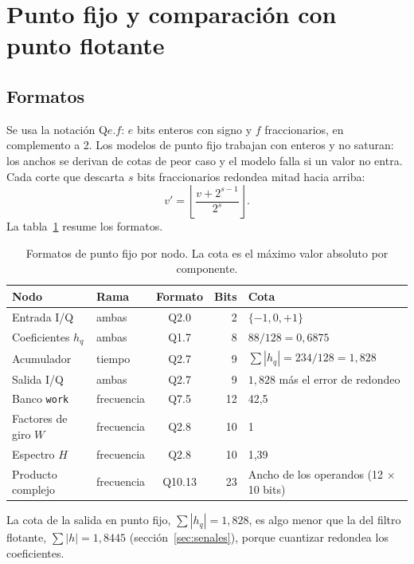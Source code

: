 \section{Punto fijo y comparación con punto flotante}\label{sec:punto-fijo}

\subsection{Formatos}

Se usa la notación Q$e.f$: $e$ bits enteros con signo y $f$ fraccionarios, en complemento a 2. Los modelos de punto fijo trabajan con enteros y no saturan: los anchos se derivan de cotas de peor caso y el modelo falla si un valor no entra. Cada corte que descarta $s$ bits fraccionarios redondea mitad hacia arriba:
\begin{equation}
  v' = \left\lfloor \frac{v + 2^{s-1}}{2^s} \right\rfloor .
\end{equation}
La tabla~\ref{tab:formatos} resume los formatos.

\begin{table}[h]
  \centering
  \caption{Formatos de punto fijo por nodo. La cota es el máximo valor absoluto por componente.}\label{tab:formatos}
  \begin{tabular}{llcrl}
    \toprule
    Nodo & Rama & Formato & Bits & Cota \\
    \midrule
    Entrada I/Q & ambas & Q2.0 & 2 & $\{-1, 0, +1\}$ \\
    Coeficientes $h_q$ & ambas & Q1.7 & 8 & $88/128 = 0{,}6875$ \\
    Acumulador & tiempo & Q2.7 & 9 & $\sum|h_q| = 234/128 = 1{,}828$ \\
    Salida I/Q & ambas & Q2.7 & 9 & $1{,}828$ más el error de redondeo \\
    Banco \texttt{work} & frecuencia & Q7.5 & 12 & 42,5 \\
    Factores de giro $W$ & frecuencia & Q2.8 & 10 & 1 \\
    Espectro $H$ & frecuencia & Q2.8 & 10 & 1,39 \\
    Producto complejo & frecuencia & Q10.13 & 23 & Ancho de los operandos (12 × 10 bits) \\
    \bottomrule
  \end{tabular}
\end{table}

La cota de la salida en punto fijo, $\sum|h_q| = 1{,}828$, es algo menor que la del filtro flotante, $\sum|h| = 1{,}8445$ (sección~\ref{sec:senales}), porque cuantizar redondea los coeficientes.

